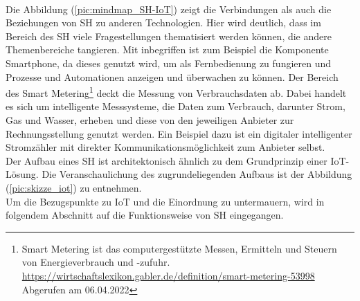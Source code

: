         \\
        Die Abbildung (\ref{pic:mindmap_SH-IoT}) zeigt die Verbindungen als auch die Beziehungen von \acl{SH} 
        zu anderen Technologien. Hier wird deutlich, dass im Bereich des \acl{SH} viele Fragestellungen 
        thematisiert werden können, die andere Themenbereiche tangieren. Mit inbegriffen ist zum Beispiel die 
        Komponente Smartphone, da dieses genutzt wird, um als Fernbedienung zu fungieren und Prozesse und 
        Automationen anzeigen und überwachen zu können. Der Bereich des Smart Metering\footnote{Smart Metering ist das computergestützte Messen, Ermitteln und Steuern von Energieverbrauch und -zufuhr. \url{https://wirtschaftslexikon.gabler.de/definition/smart-metering-53998} Abgerufen am 06.04.2022} 
        deckt die Messung von Verbrauchsdaten ab. Dabei handelt es sich um intelligente Messsysteme, die 
        Daten zum Verbrauch, darunter Strom, Gas und Wasser, erheben und diese von den jeweiligen Anbieter zur 
        Rechnungsstellung genutzt werden. Ein Beispiel dazu ist ein digitaler intelligenter Stromzähler mit 
        direkter Kommunikationsmöglichkeit zum Anbieter selbst.
        \\
        \linebreak
        Der Aufbau eines \acl{SH} ist architektonisch ähnlich zu dem Grundprinzip einer \acs{IoT}-Lösung. Die 
        Veranschaulichung des zugrundeliegenden Aufbaus ist der Abbildung (\ref{pic:skizze_iot}) zu entnehmen. 
        \\
        Um die Bezugspunkte zu \acs{IoT} und die Einordnung zu untermauern, wird in folgendem Abschnitt auf 
        die Funktionsweise von \acl{SH} eingegangen. 

